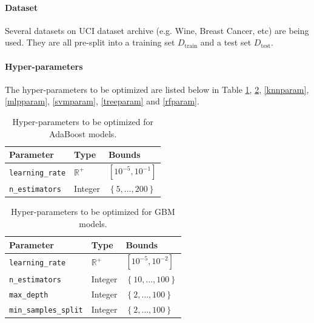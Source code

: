 \documentclass[twoside,11pt]{article}
\begin{document}
\paragraph{\textbf{Dataset}} Several datasets on UCI dataset archive (e.g. Wine, Breast Cancer, etc) are being used. They are all pre-split into a training set $D_{\operatorname{train}}$ and a test set $D_{\operatorname{test}}$.

\paragraph{\textbf{Hyper-parameters}} The hyper-parameters to be optimized are listed below in Table \ref{adaparam}, \ref{gbmparam},  \ref{knnparam}, \ref{mlpparam}, \ref{svmparam}, \ref{treeparam} and \ref{rfparam}.

\begin{table}[ht]
\centering
\begin{tabular}{@{}lll@{}}
\toprule
\textbf{Parameter}             & \textbf{Type}  & \textbf{Bounds}                          \\ \midrule
\texttt{learning\_rate}      & $\mathbb{R}^+$ & $\left[10^{-5}, 10^{-1}\right]$                         \\
\texttt{n\_estimators}       & Integer        & $\left\lbrace 5,\dots, 200 \right\rbrace$
\end{tabular}
\caption{Hyper-parameters to be optimized for AdaBoost models.}
\label{adaparam}
\end{table}

\begin{table}[ht]
\centering
\begin{tabular}{@{}lll@{}}
\toprule
\textbf{Parameter}             & \textbf{Type}  & \textbf{Bounds}                          \\ \midrule
\texttt{learning\_rate}      & $\mathbb{R}^+$ & $\left[10^{-5}, 10^{-2}\right]$                         \\
\texttt{n\_estimators}       & Integer        & $\left\lbrace 10,\dots, 100 \right\rbrace$ \\
\texttt{max\_depth}          & Integer        & $\left\lbrace 2, \dots, 100 \right\rbrace$ \\
\texttt{min\_samples\_split}  & Integer        & $\left\lbrace 2, \dots, 100 \right\rbrace$
\end{tabular}
\caption{Hyper-parameters to be optimized for GBM models.}
\label{gbmparam}
\end{table}
\end{document}
